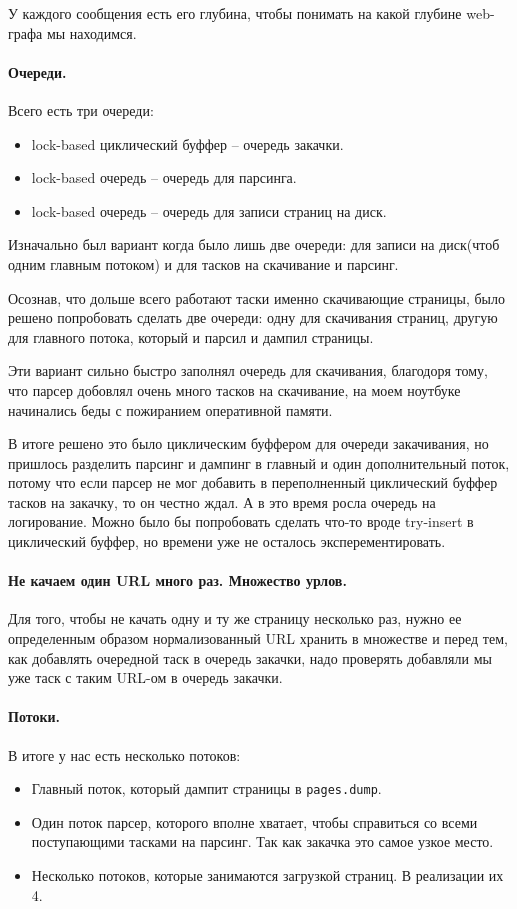 \documentclass[12pt]{article}
\begin{document}
У каждого сообщения есть его глубина, чтобы понимать на какой глубине web-графа мы
находимся.


\paragraph{Очереди.}
Всего есть три очереди:
\begin{itemize}
    \item lock-based циклический буффер -- очередь закачки.
    \item lock-based очередь -- очередь для парсинга.
    \item lock-based очередь -- очередь для записи страниц на диск.
\end{itemize}

Изначально был вариант когда было лишь две очереди: для записи на диск(чтоб одним
главным потоком) и для тасков на скачивание и парсинг.

Осознав, что дольше всего работают таски именно скачивающие страницы, было решено попробовать
сделать две очереди: одну для скачивания страниц, другую для главного потока, который и
парсил и дампил страницы.

Эти вариант сильно быстро заполнял очередь для скачивания, благодоря тому, что
парсер добовлял очень много тасков на скачивание, на моем ноутбуке начинались беды с
пожиранием оперативной памяти.

В итоге решено это было циклическим буффером для очереди закачивания, но пришлось разделить
парсинг и дампинг в главный и один дополнительный поток, потому что если парсер не мог
добавить в переполненный циклический буффер тасков на закачку, то он честно ждал. А в это
время росла очередь на логирование. Можно было бы попробовать сделать что-то вроде try-insert
в циклический буффер, но времени уже не осталось эксперементировать.


\paragraph{Не качаем один URL много раз. Множество урлов.}
Для того, чтобы не качать одну и ту же страницу несколько раз, нужно ее
определенным образом нормализованный URL хранить в множестве и перед тем, как
добавлять очередной таск в очередь закачки, надо проверять добавляли мы уже
таск с таким URL-ом в очередь закачки.


\paragraph{Потоки.}
В итоге у нас есть несколько потоков:
\begin{itemize}
    \item Главный поток, который дампит страницы в \verb|pages.dump|.
    \item Один поток парсер, которого вполне хватает, чтобы справиться
          со всеми поступающими тасками на парсинг. Так как закачка это
          самое узкое место.
    \item Несколько потоков, которые занимаются загрузкой страниц. В реализации
          их 4.
\end{itemize}
\end{document}

